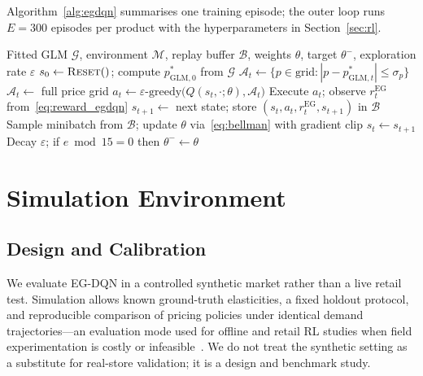 \documentclass[journal, 10pt, twoside]{IEEEtran}
\begin{document}
Algorithm~\ref{alg:egdqn} summarises one training episode; the outer
loop runs $E=300$ episodes per product with the hyperparameters in
Section~\ref{sec:rl}.

\begin{algorithm}[H]
\caption{EG-DQN Training (single episode)}
\label{alg:egdqn}
\begin{algorithmic}[1]
\Require Fitted GLM $\mathcal{G}$, environment $\mathcal{M}$,
         replay buffer $\mathcal{B}$, weights $\theta$, target
         $\theta^-$, exploration rate $\varepsilon$
\State $s_0 \gets \textsc{Reset}()$;
       compute $p^*_{\text{GLM},0}$ from $\mathcal{G}$
    $\mathcal{A}_t \gets \{p \in \text{grid} :
      |p - p^*_{\text{GLM},t}| \le \sigma_p\}$
  \Else
    $\mathcal{A}_t \gets$ full price grid
  \EndIf
  \State $a_t \gets \varepsilon\text{-greedy}\bigl(
    Q(s_t,\cdot;\theta), \mathcal{A}_t\bigr)$
  \State Execute $a_t$; observe $r_t^{\text{EG}}$
    from~\eqref{eq:reward_egdqn}
  \State $s_{t+1} \gets$ next state; store
    $(s_t,a_t,r_t^{\text{EG}},s_{t+1})$ in $\mathcal{B}$
    \State Sample minibatch from $\mathcal{B}$;
      update $\theta$ via~\eqref{eq:bellman} with gradient clip
  \EndIf
  \State $s_t \gets s_{t+1}$
\EndFor
\State Decay $\varepsilon$; if $e \bmod 15 = 0$ then $\theta^- \gets \theta$
\end{algorithmic}
\end{algorithm}

\section{Simulation Environment}
\label{sec:simulation}

\subsection{Design and Calibration}

We evaluate EG-DQN in a controlled synthetic market rather than a live
retail test.
Simulation allows known ground-truth elasticities, a fixed holdout
protocol, and reproducible comparison of pricing policies under identical
demand trajectories---an evaluation mode used for offline and retail RL
studies when field experimentation is costly or infeasible~\cite{nambiar2022,
xia2023, xia2024, chen2023}.
We do not treat the synthetic setting as a substitute for real-store
validation; it is a design and benchmark study.
\end{document}
